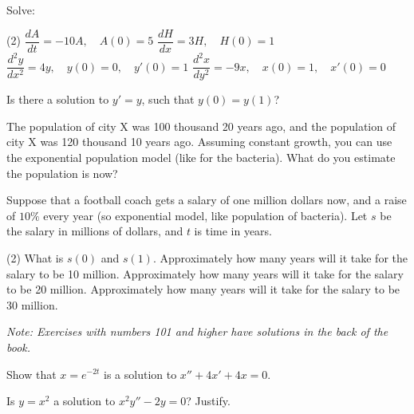 \begin{exercise}
Solve:
\begin{tasks}(2)
\task $\dfrac{dA}{dt} = -10 A, \quad A(0)=5$
\task $\dfrac{dH}{dx} = 3 H, \quad H(0)=1$
\task $\dfrac{d^2y}{dx^2} = 4 y, \quad y(0)=0, \quad y'(0)=1$
\task $\dfrac{d^2x}{dy^2} = -9 x, \quad x(0)=1, \quad x'(0)=0$
\end{tasks}
\end{exercise}

\begin{exercise}
Is there a solution to $y' = y$, such that $y(0) = y(1)$?
\end{exercise}

\begin{exercise}
The population of city X was 100 thousand 20 years ago, and 
the population of city X was 120 thousand 10 years ago.  Assuming constant
growth, you can use the exponential population model
(like for the bacteria).  What do you estimate the population is now?
\end{exercise}

\begin{exercise}
Suppose that a football coach gets a salary of
one million dollars now, and a raise of $10\%$ every year
(so exponential model, like population of bacteria).
Let $s$ be the salary in millions of dollars, and $t$ is time in years.
\begin{tasks}(2)
\task
What is $s(0)$ and $s(1)$.
\task
Approximately how many years will it take for the salary to be 10 million.
\task
Approximately how many years will it take for the salary to be 20 million.
\task
Approximately how many years will it take for the salary to be 30 million.
\end{tasks}
\end{exercise}


\noindent
\emph{Note: Exercises with numbers 101 and higher have solutions in the
back of the book.}


\setcounter{exercise}{100}

\begin{exercise}
Show that $x = e^{-2t}$ is a solution to $x'' + 4x' + 4x = 0$.
\end{exercise}

\begin{exercise}
Is $y = x^2$ a solution to $x^2y'' - 2y = 0$?  Justify.
\end{exercise}

